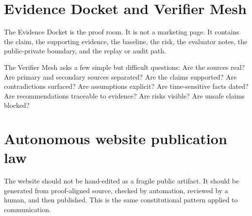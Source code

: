 \documentclass[11pt]{article}
\begin{document}
\section{Evidence Docket and Verifier Mesh}
The Evidence Docket is the proof room. It is not a marketing page. It contains the claim, the supporting evidence, the baseline, the risk, the evaluator notes, the public-private boundary, and the replay or audit path.

\begin{center}
\end{center}

The Verifier Mesh asks a few simple but difficult questions: Are the sources real? Are primary and secondary sources separated? Are the claims supported? Are contradictions surfaced? Are assumptions explicit? Are time-sensitive facts dated? Are recommendations traceable to evidence? Are risks visible? Are unsafe claims blocked?

\section{Autonomous website publication law}
The website should not be hand-edited as a fragile public artifact. It should be generated from proof-aligned source, checked by automation, reviewed by a human, and then published. This is the same constitutional pattern applied to communication.
\end{document}

